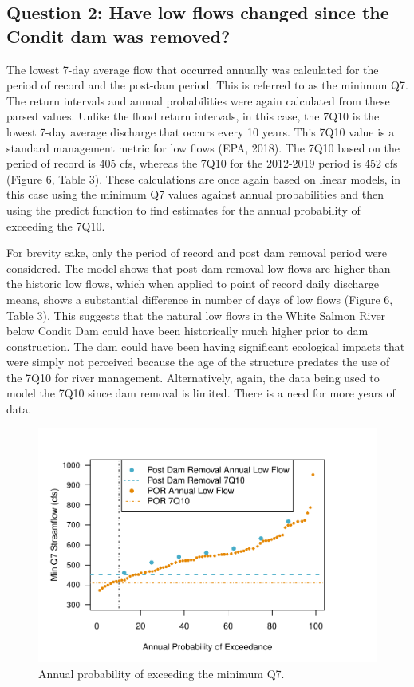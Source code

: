 \documentclass[
  12pt,
]{article}
\begin{document}
\hypertarget{question-2-have-low-flows-changed-since-the-condit-dam-was-removed}{%
\subsection{Question 2: Have low flows changed since the Condit dam was
removed?}\label{question-2-have-low-flows-changed-since-the-condit-dam-was-removed}}

The lowest 7-day average flow that occurred annually was calculated for
the period of record and the post-dam period. This is referred to as the
minimum Q7. The return intervals and annual probabilities were again
calculated from these parsed values. Unlike the flood return intervals,
in this case, the 7Q10 is the lowest 7-day average discharge that occurs
every 10 years. This 7Q10 value is a standard management metric for low
flows (EPA, 2018). The 7Q10 based on the period of record is 405 cfs,
whereas the 7Q10 for the 2012-2019 period is 452 cfs (Figure 6, Table
3). These calculations are once again based on linear models, in this
case using the minimum Q7 values against annual probabilities and then
using the predict function to find estimates for the annual probability
of exceeding the 7Q10.

For brevity sake, only the period of record and post dam removal period
were considered. The model shows that post dam removal low flows are
higher than the historic low flows, which when applied to point of
record daily discharge means, shows a substantial difference in number
of days of low flows (Figure 6, Table 3). This suggests that the natural
low flows in the White Salmon River below Condit Dam could have been
historically much higher prior to dam construction. The dam could have
been having significant ecological impacts that were simply not
perceived because the age of the structure predates the use of the 7Q10
for river management. Alternatively, again, the data being used to model
the 7Q10 since dam removal is limited. There is a need for more years of
data.

\begin{figure}
\centering
\includegraphics{WhiteSalmon_WriteUp_files/figure-latex/fig6-1.pdf}
\caption{Annual probability of exceeding the minimum Q7.}
\end{figure}
\end{document}
